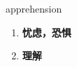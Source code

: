 
\begin{frame}
{\huge apprehension}
\begin{center}
\begin{enumerate}\Large
  \item \textbf{忧虑，恐惧}
  \item \textbf{理解}
\end{enumerate}
\end{center}
\end{frame}
